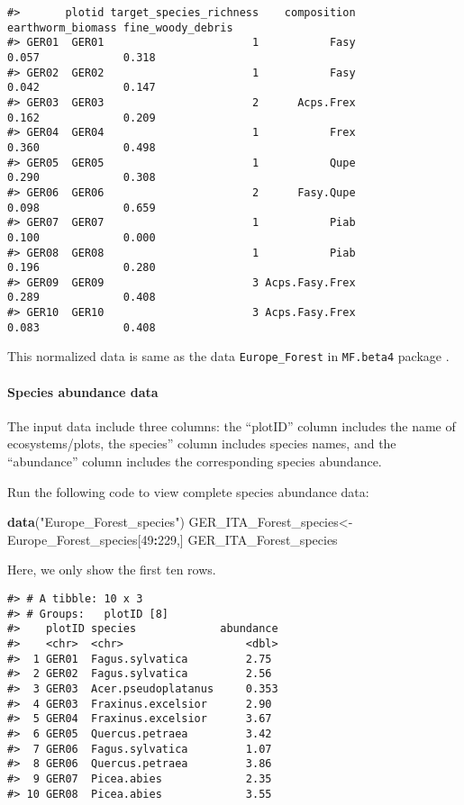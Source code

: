 \documentclass[
]{article}
\newenvironment{Shaded}{\begin{snugshade}}{\end{snugshade}}
\newcommand{\DecValTok}[1]{\textcolor[rgb]{0.00,0.00,0.81}{#1}}
\newcommand{\FunctionTok}[1]{\textcolor[rgb]{0.13,0.29,0.53}{\textbf{#1}}}
\newcommand{\NormalTok}[1]{#1}
\newcommand{\OtherTok}[1]{\textcolor[rgb]{0.56,0.35,0.01}{#1}}
\newcommand{\SpecialCharTok}[1]{\textcolor[rgb]{0.81,0.36,0.00}{\textbf{#1}}}
\newcommand{\StringTok}[1]{\textcolor[rgb]{0.31,0.60,0.02}{#1}}
\begin{document}
\begin{verbatim}
#>       plotid target_species_richness    composition earthworm_biomass fine_woody_debris
#> GER01  GER01                       1           Fasy             0.057             0.318
#> GER02  GER02                       1           Fasy             0.042             0.147
#> GER03  GER03                       2      Acps.Frex             0.162             0.209
#> GER04  GER04                       1           Frex             0.360             0.498
#> GER05  GER05                       1           Qupe             0.290             0.308
#> GER06  GER06                       2      Fasy.Qupe             0.098             0.659
#> GER07  GER07                       1           Piab             0.100             0.000
#> GER08  GER08                       1           Piab             0.196             0.280
#> GER09  GER09                       3 Acps.Fasy.Frex             0.289             0.408
#> GER10  GER10                       3 Acps.Fasy.Frex             0.083             0.408
\end{verbatim}

This normalized data is same as the data \texttt{Europe\_Forest} in
\texttt{MF.beta4} package .

\hypertarget{species-abundance-data}{%
\paragraph{Species abundance data}\label{species-abundance-data}}

The input data include three columns: the ``plotID'' column includes the
name of ecosystems/plots, the species'' column includes species names,
and the ``abundance'' column includes the corresponding species
abundance.

Run the following code to view complete species abundance data:

\begin{Shaded}
\begin{Highlighting}[]
\FunctionTok{data}\NormalTok{(}\StringTok{"Europe\_Forest\_species"}\NormalTok{)}
\NormalTok{GER\_ITA\_Forest\_species}\OtherTok{\textless{}{-}}\NormalTok{Europe\_Forest\_species[}\DecValTok{49}\SpecialCharTok{:}\DecValTok{229}\NormalTok{,]}
\NormalTok{GER\_ITA\_Forest\_species}
\end{Highlighting}
\end{Shaded}

Here, we only show the first ten rows.

\begin{verbatim}
#> # A tibble: 10 x 3
#> # Groups:   plotID [8]
#>    plotID species             abundance
#>    <chr>  <chr>                   <dbl>
#>  1 GER01  Fagus.sylvatica         2.75 
#>  2 GER02  Fagus.sylvatica         2.56 
#>  3 GER03  Acer.pseudoplatanus     0.353
#>  4 GER03  Fraxinus.excelsior      2.90 
#>  5 GER04  Fraxinus.excelsior      3.67 
#>  6 GER05  Quercus.petraea         3.42 
#>  7 GER06  Fagus.sylvatica         1.07 
#>  8 GER06  Quercus.petraea         3.86 
#>  9 GER07  Picea.abies             2.35 
#> 10 GER08  Picea.abies             3.55
\end{verbatim}
\end{document}
